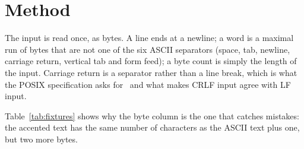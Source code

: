 \section{Method}
\label{sec:method}

The input is read once, as bytes. A line ends at a newline; a word is a maximal run of
bytes that are not one of the six ASCII separators (space, tab, newline, carriage
return, vertical tab and form feed); a byte count is simply the length of the input.
Carriage return is a separator rather than a line break, which is what the POSIX
specification asks for~\cite{posix2024} and what makes CRLF input agree with LF input.

\begin{table}[h]
  \centering
  \caption{Fixtures used by the test suite.}
  \label{tab:fixtures}
  
\end{table}

Table~\ref{tab:fixtures} shows why the byte column is the one that catches mistakes:
the accented text has the same number of characters as the ASCII text plus one, but
two more bytes.
